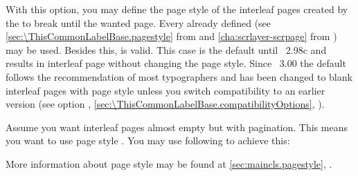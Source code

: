 \begin{Declaration}
\end{Declaration}%
With this option, %
you may define the page style of the interleaf pages created by the
 to break until the wanted page. Every already defined
 (see \autoref{sec:\ThisCommonLabelBase.pagestyle} from
 and
\autoref{cha:scrlayer-scrpage} from ) may be
used. Besides this,  is valid. This case
is the default until \KOMAScript~2.98c and results in interleaf page without
changing the page style. Since \KOMAScript~3.00%
the default follows the recommendation of most typographers and has been
changed to blank interleaf pages with page style  unless you
switch compatibility to an earlier version (see option
,
\autoref{sec:\ThisCommonLabelBase.compatibilityOptions},
).
\IfThisCommonLabelBase{maincls}{\iftrue}{\csname iffalse\endcsname}
  \begin{Example}
    Assume you want interleaf pages almost empty but with pagination. This
    means you want to use page style . You may use following
    to achieve this:
\begin{lstcode}
\end{lstcode}
    More information about page style  may be found at
    \autoref{sec:maincls.pagestyle},
    .
  \end{Example}
\else
  \IfThisCommonLabelBase{scrextend}{\iftrue}{\csname iffalse\endcsname}
    \begin{Example}
      \phantomsection\xmpllabel{option.cleardoublepage}%
      Assume you want interleaf pages almost empty but with pagination. This
      means you want to use page style \PageStyle{plain}. You may use
      following to achieve this:
\begin{lstcode}
  \KOMAoptions{cleardoublepage=plain}
\end{lstcode}
      More information about page style \PageStyle{plain} may be found at
      \autoref{sec:maincls.pagestyle},
      \autopageref{desc:maincls.pagestyle.plain}.
    \end{Example}%
  \fi%
\fi%
\EndIndexGroup


